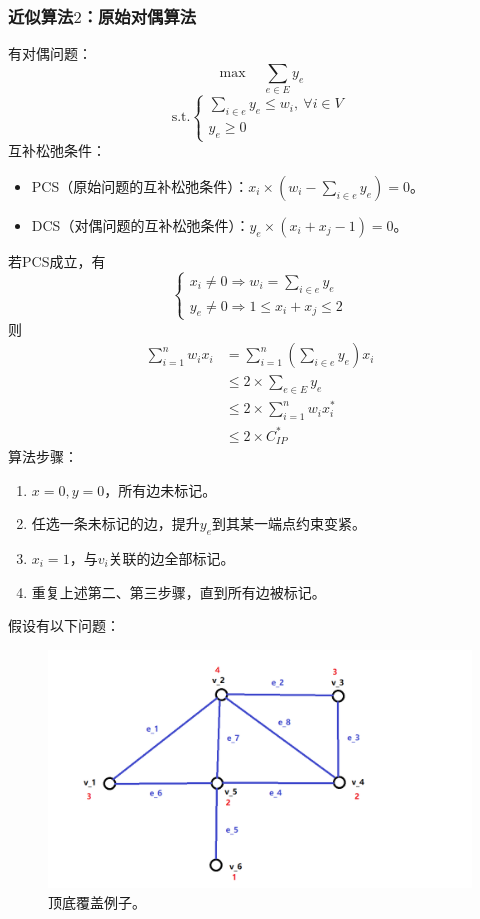 \subsubsection{近似算法$2$：原始对偶算法}
有对偶问题：
$$
\max \quad \sum_{e \in E} y_e
$$
$$
\text{s.t.} 
\begin{cases}
    \sum_{i \in e} y_e \le w_i, \ \forall i \in V \\
    y_e \ge 0
\end{cases}
$$
互补松弛条件：
\begin{itemize}
    \item PCS（原始问题的互补松弛条件）：$x_i \times (w_i - \sum_{i \in e}y_e) = 0$。
    \item DCS（对偶问题的互补松弛条件）：$y_e \times (x_i + x_j - 1) = 0$。
\end{itemize}
若PCS成立，有
$$
\begin{cases}
x_i \ne 0 \Rightarrow w_i = \sum_{i \in e}y_e \\
y_e \ne 0 \Rightarrow 1 \le x_i + x_j \le 2
\end{cases}
$$
则
\begin{align}
    \sum_{i = 1}^nw_ix_i & = \sum_{i = 1}^n (\sum_{i \in e}y_e)x_i \nonumber \\ 
    & \le 2 \times \sum_{e \in E}y_e \nonumber \\
    & \le 2 \times \sum_{i = 1}^n w_ix_i^* \nonumber \\ 
    & \le 2 \times C_{IP}^* \nonumber
\end{align}
算法步骤：
\begin{enumerate}
    \item $x = 0, y = 0$，所有边未标记。
    \item 任选一条未标记的边，提升$y_e$到其某一端点约束变紧。
    \item $x_i = 1$，与$v_i$关联的边全部标记。
    \item 重复上述第二、第三步骤，直到所有边被标记。
\end{enumerate}
假设有以下问题：
\begin{figure}[H]
    \begin{center}
        \includegraphics[scale=0.4]{img/vertex_cover.png}
        \caption{顶底覆盖例子。}
    \end{center}
\end{figure}
